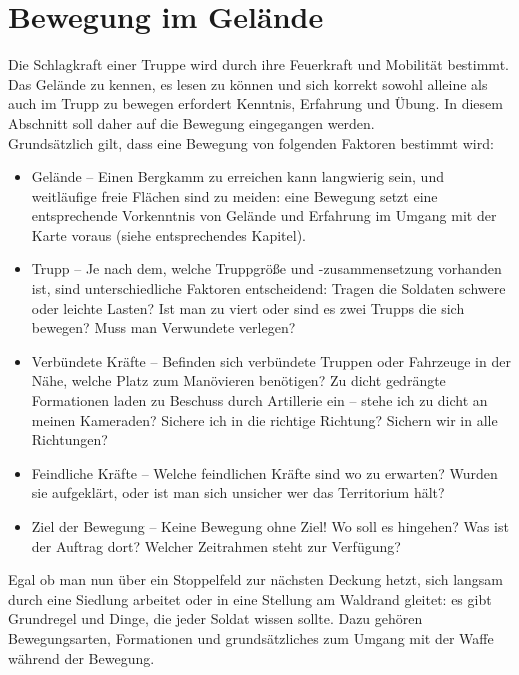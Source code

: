 \pagebreak
\section{Bewegung im Gelände}
	Die Schlagkraft einer Truppe wird durch ihre Feuerkraft und Mobilität bestimmt. Das Gelände zu kennen, es lesen zu können und sich korrekt sowohl alleine als auch im Trupp zu bewegen erfordert Kenntnis, Erfahrung und Übung. In diesem Abschnitt soll daher auf die Bewegung eingegangen werden.\\

	Grundsätzlich gilt, dass eine Bewegung von folgenden Faktoren bestimmt wird:
	\begin{itemize}
		\item Gelände -- Einen Bergkamm zu erreichen kann langwierig sein, und weitläufige freie Flächen sind zu meiden: eine Bewegung setzt eine 	entsprechende Vorkenntnis von Gelände und Erfahrung im Umgang mit der Karte voraus (siehe entsprechendes Kapitel).
		\item Trupp -- Je nach dem, welche Truppgröße und -zusammensetzung vorhanden ist, sind unterschiedliche Faktoren entscheidend: Tragen die Soldaten schwere oder leichte Lasten? Ist man zu viert oder sind es zwei Trupps die sich bewegen? Muss man Verwundete verlegen? 
		\item Verbündete Kräfte -- Befinden sich verbündete Truppen oder Fahrzeuge in der Nähe, welche Platz zum Manövieren benötigen? Zu dicht gedrängte Formationen laden zu Beschuss durch Artillerie ein -- stehe ich zu dicht an meinen Kameraden? Sichere ich in die richtige Richtung? Sichern wir in alle Richtungen?
		\item Feindliche Kräfte -- Welche feindlichen Kräfte sind wo zu erwarten? Wurden sie aufgeklärt, oder ist man sich unsicher wer das Territorium hält?
		\item Ziel der Bewegung -- Keine Bewegung ohne Ziel! Wo soll es hingehen? Was ist der Auftrag dort? Welcher Zeitrahmen steht zur Verfügung?
	\end{itemize}
	Egal ob man nun über ein Stoppelfeld zur nächsten Deckung hetzt, sich langsam durch eine Siedlung arbeitet oder in eine Stellung am Waldrand gleitet: es gibt Grundregel und Dinge, die jeder Soldat wissen sollte. Dazu gehören Bewegungsarten, Formationen und grundsätzliches zum Umgang mit der Waffe während der Bewegung.

